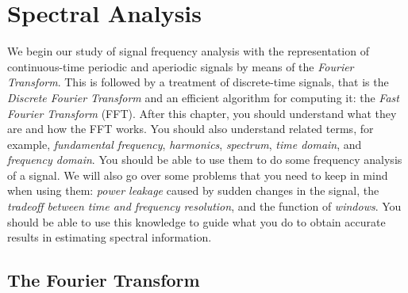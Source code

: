 
%
%
%
%
%
%
%
%
%

\chapter{Spectral Analysis}
\label{ch:fft}

We begin our study of signal frequency analysis with the
representation of continuous-time periodic and aperiodic signals by
means of the \emph{Fourier Transform}.  This is followed by a
treatment of discrete-time signals, that is the
\emph{Discrete Fourier Transform} and an efficient algorithm for
computing it: the \emph{Fast Fourier Transform} (FFT). After this
chapter, you should understand what they are and how the FFT works. You
should also understand related terms, for example, \emph{fundamental
frequency}, \emph{harmonics}, \emph{spectrum}, \emph{time domain}, and
\emph{frequency domain}. You should be able to use them to do some
frequency analysis of a signal.  We will also go over some problems
that you need to keep in mind when using them:
\emph{power leakage} caused by sudden changes in the signal, the
\emph{tradeoff between time and frequency resolution}, and the
function of
\emph{windows}. You should be able to use this knowledge to guide what
you do to obtain accurate results in estimating spectral information.

\section{The Fourier Transform}
\label{sc:fourier-xform}

